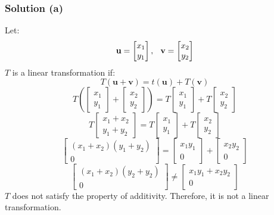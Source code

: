 \documentclass[12pt]{article}
\begin{document}
\subsubsection*{Solution (a)}
Let:
\[
  \textbf{u} = \begin{bmatrix}
    x_1\\ 
    y_1 
  \end{bmatrix}, \hspace{0.1in} \textbf{v} = \begin{bmatrix}
  x_2\\ 
  y_2 
  \end{bmatrix}
\]
$T$ is a linear transformation if:
\[
  T(\textbf{u} + \textbf{v}) = t(\textbf{u}) + T(\textbf{v})
\]
\[
  T\left(\begin{bmatrix}
    x_1\\ 
    y_1 
    \end{bmatrix} + \begin{bmatrix}
    x_2\\ 
    y_2 
  \end{bmatrix}\right) = T\begin{bmatrix}
  x_1\\ 
  y_1 
  \end{bmatrix} + T\begin{bmatrix}
  x_2\\ 
  y_2 
  \end{bmatrix}
\]
\[
  T\begin{bmatrix}
    x_1 + x_2\\ 
    y_1 + y_2 
  \end{bmatrix} = T\begin{bmatrix}
  x_1\\ 
  y_1 
  \end{bmatrix} + T\begin{bmatrix}
  x_2\\ 
  y_2 
  \end{bmatrix}
\]
\[
  \begin{bmatrix}
    (x_1 + x_2)(y_1 + y_2)\\ 
    0 
  \end{bmatrix} = \begin{bmatrix}
  x_1y_1\\ 
  0 
  \end{bmatrix} + \begin{bmatrix}
  x_2y_2\\ 
  0 
  \end{bmatrix}
\]
\[
  \begin{bmatrix}
    (x_1 + x_2)(y_2 + y_2)\\ 
    0 
  \end{bmatrix} \neq \begin{bmatrix}
  x_1y_1 + x_2y_2\\ 
  0 
  \end{bmatrix}
\]
$T$ does not satisfy the property of additivity. Therefore, it is not a linear transformation. 
\vspace{2in}
\end{document}
